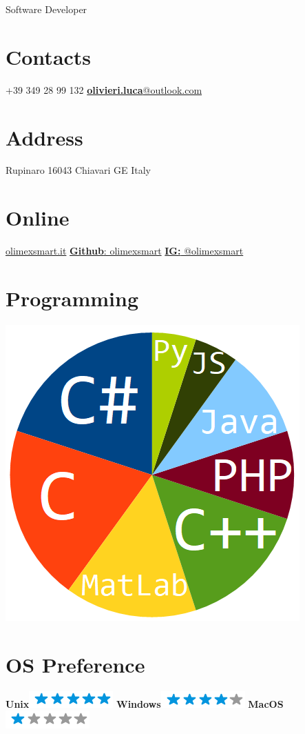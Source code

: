 \documentclass[]{friggeri-cv}
\begin{document}
      {Software Developer}
      

\begin{aside}
  \section{Contacts}    
	+39 349 28 99 132
	\href{mailto:gliolivieri@live.it}{\textbf{olivieri.luca}@outlook.com}
	~	
  \section{Address}
  	Rupinaro
    16043 Chiavari GE
    Italy
    ~
  \section{Online}
    \href{http://www.olimexsmart.it}{olimexsmart.it}    
    \href{https://github.com/olimexsmart}{\textbf{Github}: olimexsmart}
    \href{https://www.instagram.com/olimexsmart/}{\textbf{IG: }@olimexsmart}
    ~
  \section{Programming}
    \includegraphics[scale=0.3]{img/progskilz.png}
    ~
  \section{OS Preference}
    \textbf{Unix}\includegraphics[scale=0.40]{img/5stars.png}
    \textbf{Windows}\includegraphics[scale=0.40]{img/4stars.png}
    \textbf{MacOS}\includegraphics[scale=0.40]{img/1stars.png}
    ~

\end{aside}
\end{document}
